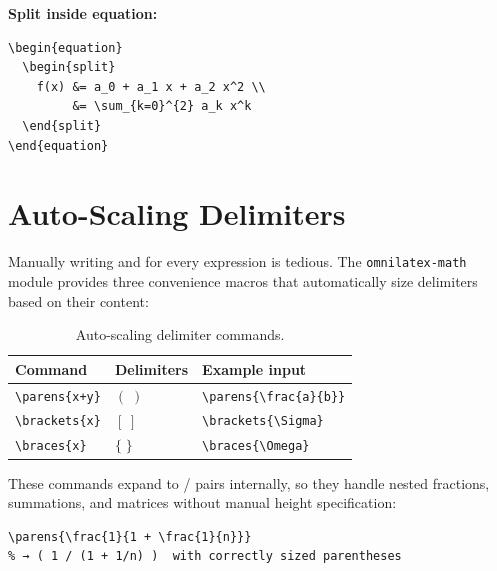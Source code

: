 \textbf{Split inside equation:}

\begin{verbatim}
\begin{equation}
  \begin{split}
    f(x) &= a_0 + a_1 x + a_2 x^2 \\
         &= \sum_{k=0}^{2} a_k x^k
  \end{split}
\end{equation}
\end{verbatim}

\section{Auto-Scaling Delimiters}

Manually writing  and  for every expression is
tedious.  The \texttt{omnilatex-math} module provides three convenience
macros that automatically size delimiters based on their content:

\begin{table}[htbp]
  \centering
  \caption{Auto-scaling delimiter commands.}
  \label{tab:delimiters}
  \begin{tabular}{@{}lll@{}}
    \toprule
    Command                              & Delimiters & Example input         \\
    \midrule
    \texttt{\textbackslash parens\{x+y\}}  & $(\;)$ & \texttt{\textbackslash parens\{\textbackslash frac\{a\}\{b\}\}} \\
    \texttt{\textbackslash brackets\{x\}}  & $[\;]$ & \texttt{\textbackslash brackets\{\textbackslash Sigma\}} \\
    \texttt{\textbackslash braces\{x\}}    & $\{\;\}$ & \texttt{\textbackslash braces\{\textbackslash Omega\}} \\
    \bottomrule
  \end{tabular}
\end{table}

These commands expand to  /  pairs internally, so they
handle nested fractions, summations, and matrices without manual height
specification:

\begin{verbatim}
\parens{\frac{1}{1 + \frac{1}{n}}}
% → ( 1 / (1 + 1/n) )  with correctly sized parentheses
\end{verbatim}

